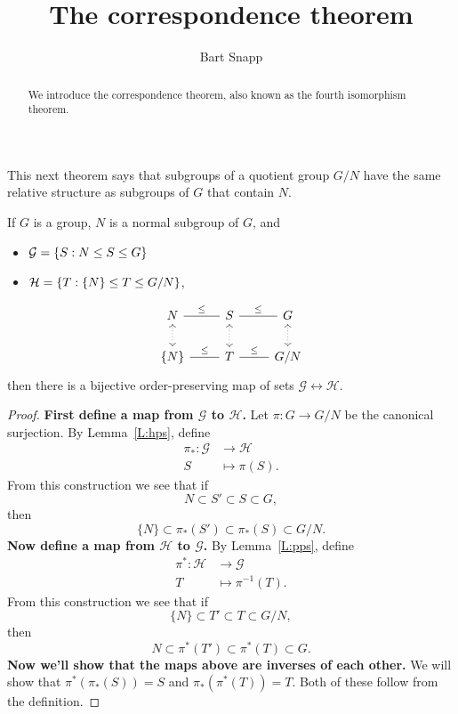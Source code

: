 \documentclass{ximera}
\author{Bart Snapp}
\title{The correspondence theorem}
\begin{document}
\begin{abstract}
  We introduce the correspondence theorem, also known as the fourth
  isomorphism theorem.
\end{abstract}
\maketitle

This next theorem says that subgroups of a quotient group $G/N$ have
the same relative structure as subgroups of $G$ that contain $N$.

\begin{theorem}
  If $G$ is a group, $N$ is a normal subgroup of $G$, and
  \begin{itemize}
  \item $\mathcal{G} = \{S:N\leq S\leq G\}$
  \item $\mathcal{H} = \{T:\{N\}\leq T\leq G/N\}$,
  \end{itemize}
  \[
  \begin{tikzcd}
    N \ar[r,-,"\subgp"] \ar[d,<->,dotted]& S\ar[r,-,"\subgp"] \ar[d,<->,dotted]& G \ar[d,<->,dotted]\\
    \{N\} \ar[r,-,"\subgp"] & T \ar[r,-,"\subgp"] & G/N
  \end{tikzcd}
  \]
  then there is a bijective order-preserving map of sets
  $\mathcal{G}\leftrightarrow\mathcal{H}$.
  \begin{proof}
    \textbf{First define a map from $\pmb{\mathcal{G}}$ to
      $\pmb{\mathcal{H}}$.} Let $\pi:G\to G/N$ be the canonical
    surjection.  By Lemma~\ref{L:hps}, define
    \begin{align*}
    \pi_*:\mathcal{G} &\to \mathcal{H}\\
    S &\mapsto \pi(S).
    \end{align*}
    From this construction we see that if
    \[
    N \subset S'\subset S \subset G,
    \]
    then
    \[
    \{N\}\subset \pi_*(S') \subset \pi_*(S)\subset G/N.
    \]
    \textbf{Now define a map from $\pmb{\mathcal{H}}$ to
      $\pmb{\mathcal{G}}$.}
    By Lemma~\ref{L:pps}, define
    \begin{align*}
      \pi^*:\mathcal{H} &\to \mathcal G\\ T &\mapsto
      \pi^{-1}(T).
    \end{align*}
    From this construction we see that if
    \[
    \{N\} \subset T\hspace{0em}' \subset T \subset G/N,
    \]
    then
    \[
    N \subset \pi^*(T\hspace{0em}')\subset \pi^*(T) \subset G.
    \]
    \textbf{Now we'll show that the maps above are inverses of each
      other.} We will show that $\pi^*(\pi_*(S)) = S$ and
    $\pi_*(\pi^*(T)) = T$. Both of these follow from the
    definition.


\end{proof}
\end{theorem}
\end{document}
